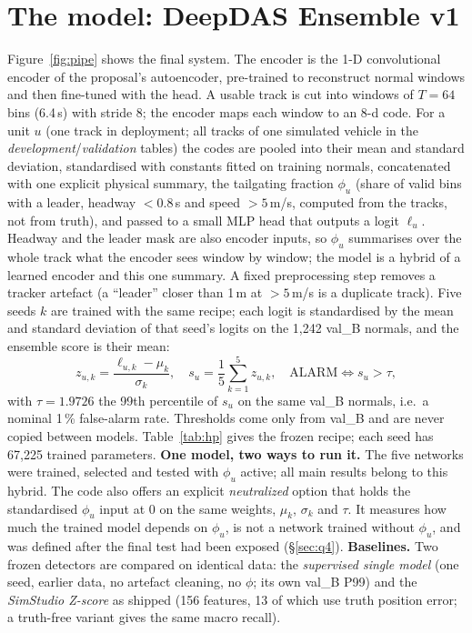 \documentclass[10pt,a4paper,twocolumn]{article}
\newcommand{\EDIV}{DeepDAS Ensemble v1}\newcommand{\dev}{\textit{development}}\newcommand{\val}{\textit{validation}}\newcommand{\ft}{\textit{final test}}
\begin{document}
\section{The model: \EDIV}\label{sec:model}
Figure~\ref{fig:pipe} shows the final system. The encoder is the 1-D convolutional encoder of the proposal's autoencoder, pre-trained to reconstruct normal windows and then fine-tuned with the head. A usable track is cut into windows of $T=64$ bins (6.4\,s) with stride 8; the encoder maps each window to an 8-d code. For a unit $u$ (one track in deployment; all tracks of one simulated vehicle in the \dev{}/\val{} tables) the codes are pooled into their mean and standard deviation, standardised with constants fitted on training normals, concatenated with one explicit physical summary, the tailgating fraction $\phi_u$ (share of valid bins with a leader, headway $<0.8$\,s and speed $>5$\,m/s, computed from the tracks, not from truth), and passed to a small MLP head that outputs a logit $\ell_u$. Headway and the leader mask are also encoder inputs, so $\phi_u$ summarises over the whole track what the encoder sees window by window; the model is a hybrid of a learned encoder and this one summary. A fixed preprocessing step removes a tracker artefact (a ``leader'' closer than 1\,m at $>5$\,m/s is a duplicate track). Five seeds $k$ are trained with the same recipe; each logit is standardised by the mean and standard deviation of that seed's logits on the 1{,}242 val\_B normals, and the ensemble score is their mean:
\begin{equation}
 z_{u,k}=\frac{\ell_{u,k}-\mu_k}{\sigma_k},\quad s_u=\frac{1}{5}\sum_{k=1}^{5} z_{u,k},\quad \text{ALARM}\iff s_u>\tau,
\end{equation}
with $\tau=1.9726$ the 99th percentile of $s_u$ on the same val\_B normals, i.e.\ a nominal 1\,\% false-alarm rate. Thresholds come only from val\_B and are never copied between models. Table~\ref{tab:hp} gives the frozen recipe; each seed has 67{,}225 trained parameters.
\textbf{One model, two ways to run it.} The five networks were trained, selected and tested with $\phi_u$ active; all main results belong to this hybrid. The code also offers an explicit \emph{neutralized} option that holds the standardised $\phi_u$ input at 0 on the same weights, $\mu_k$, $\sigma_k$ and $\tau$. It measures how much the trained model depends on $\phi_u$, is not a network trained without $\phi_u$, and was defined after the final test had been exposed (\S\ref{sec:q4}).
\textbf{Baselines.} Two frozen detectors are compared on identical data: the \emph{supervised single model} (one seed, earlier data, no artefact cleaning, no $\phi$; its own val\_B P99) and the \emph{SimStudio Z-score} as shipped (156 features, 13 of which use truth position error; a truth-free variant gives the same macro recall).
\end{document}

